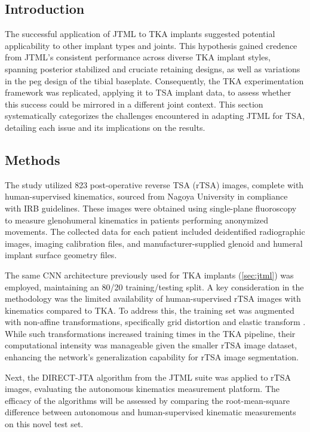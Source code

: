 \subsection{Introduction}
The successful application of JTML to TKA implants suggested potential applicability to other implant types and joints.
This hypothesis gained credence from JTML's consistent performance across diverse TKA implant styles, spanning posterior stabilized and cruciate retaining designs, as well as variations in the peg design of the tibial baseplate.
Consequently, the TKA experimentation framework was replicated, applying it to TSA implant data, to assess whether this success could be mirrored in a different joint context.
This section systematically categorizes the challenges encountered in adapting JTML for TSA, detailing each issue and its implications on the results.

\subsection{Methods}
The study utilized 823 post-operative reverse TSA (rTSA) images, complete with human-supervised kinematics, sourced from Nagoya University in compliance with IRB guidelines.
These images were obtained using single-plane fluoroscopy to measure glenohumeral kinematics in patients performing anonymized movements.
The collected data for each patient included deidentified radiographic images, imaging calibration files, and manufacturer-supplied glenoid and humeral implant surface geometry files.


The same CNN architecture previously used for TKA implants \cite{wangDeepHighResolutionRepresentation2020} (\cref{sec:jtml}) was employed, maintaining an 80/20 training/testing split.
A key consideration in the methodology was the limited availability of human-supervised rTSA images with kinematics compared to TKA.
To address this, the training set was augmented with non-affine transformations, specifically grid distortion and elastic transform \cite{buslaevAlbumentationsFastFlexible2020}.
While such transformations increased training times in the TKA pipeline, their computational intensity was manageable given the smaller rTSA image dataset, enhancing the network's generalization capability for rTSA image segmentation.

Next, the DIRECT-JTA algorithm from the JTML suite was applied to rTSA images, evaluating the autonomous kinematics measurement platform.
The efficacy of the algorithms will be assessed by comparing the root-mean-square difference between autonomous and human-supervised kinematic measurements on this novel test set.

